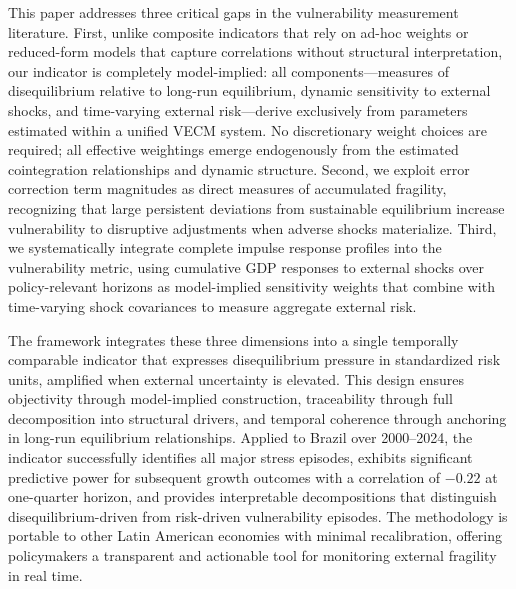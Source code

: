 \documentclass[12pt,a4paper]{article}
\numberwithin{equation}{section}
\theoremstyle{definition}
\theoremstyle{remark}
\begin{document}
This paper addresses three critical gaps in the vulnerability measurement literature. First, unlike composite indicators that rely on ad-hoc weights or reduced-form models that capture correlations without structural interpretation, our indicator is completely model-implied: all components---measures of disequilibrium relative to long-run equilibrium, dynamic sensitivity to external shocks, and time-varying external risk---derive exclusively from parameters estimated within a unified VECM system. No discretionary weight choices are required; all effective weightings emerge endogenously from the estimated cointegration relationships and dynamic structure. Second, we exploit error correction term magnitudes as direct measures of accumulated fragility, recognizing that large persistent deviations from sustainable equilibrium increase vulnerability to disruptive adjustments when adverse shocks materialize. Third, we systematically integrate complete impulse response profiles into the vulnerability metric, using cumulative GDP responses to external shocks over policy-relevant horizons as model-implied sensitivity weights that combine with time-varying shock covariances to measure aggregate external risk.

The framework integrates these three dimensions into a single temporally comparable indicator that expresses disequilibrium pressure in standardized risk units, amplified when external uncertainty is elevated. This design ensures objectivity through model-implied construction, traceability through full decomposition into structural drivers, and temporal coherence through anchoring in long-run equilibrium relationships. Applied to Brazil over 2000--2024, the indicator successfully identifies all major stress episodes, exhibits significant predictive power for subsequent growth outcomes with a correlation of $-0.22$ at one-quarter horizon, and provides interpretable decompositions that distinguish disequilibrium-driven from risk-driven vulnerability episodes. The methodology is portable to other Latin American economies with minimal recalibration, offering policymakers a transparent and actionable tool for monitoring external fragility in real time.


\end{document}

